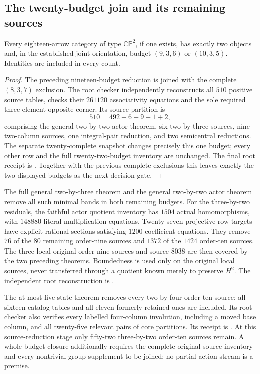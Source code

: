 \subsection{The twenty-budget join and its remaining sources}

\begin{corollary}
\label{CP2:A-eighteen-two-two-object-budgets}
Every eighteen-arrow category of type $\mathbb{CP}^2$, if one exists,
has exactly two objects and, in the established joint orientation,
budget $(9,3,6)$ or $(10,3,5)$. Identities are included in every count.
\end{corollary}
\begin{proof}
The preceding nineteen-budget reduction is joined with the complete
$(8,3,7)$ exclusion. The root checker independently reconstructs all
$510$ positive source tables, checks their $261120$ associativity
equations and the sole required three-element opposite corner.
Its source partition is
\[
 510=492+6+9+1+2,
\]
comprising the general two-by-two actor theorem, six two-by-three
sources, nine two-column sources, one integral-pair reduction, and
two semicentral reductions. The separate twenty-complete snapshot
changes precisely this one budget; every other row and the full
twenty-two-budget inventory are unchanged. The final root receipt is
.
Together with the previous complete exclusions this leaves exactly
the two displayed budgets as the next decision gate.
\end{proof}

\begin{remark*}
The full general two-by-three theorem and the general two-by-two
actor theorem remove all such minimal bands in both remaining
budgets. For the three-by-two residuals, the faithful actor quotient
inventory has $1504$ actual homomorphisms, with $148880$ literal
multiplication equations. Twenty-seven projective row targets have
explicit rational sections satisfying $1200$ coefficient equations.
They remove $76$ of the $80$ remaining order-nine sources and
$1372$ of the $1424$ order-ten sources. The three local original
order-nine sources and source $8038$ are then covered by the two
preceding theorems. Boundedness is used only on the original local
sources, never transferred through a quotient known merely to
preserve $H^2$. The independent root reconstruction is
.

The at-most-five-state theorem removes every two-by-four order-ten
source: all sixteen catalog tables and all eleven formerly retained
ones are included. Its root checker also verifies every labelled
four-column involution, including a moved base column, and all
twenty-five relevant pairs of core partitions. Its receipt is
.
At this source-reduction stage only fifty-two three-by-two order-ten
sources remain. A whole-budget closure additionally requires the
complete original source inventory and every nontrivial-group
supplement to be joined; no partial action stream is a premise.
\end{remark*}
